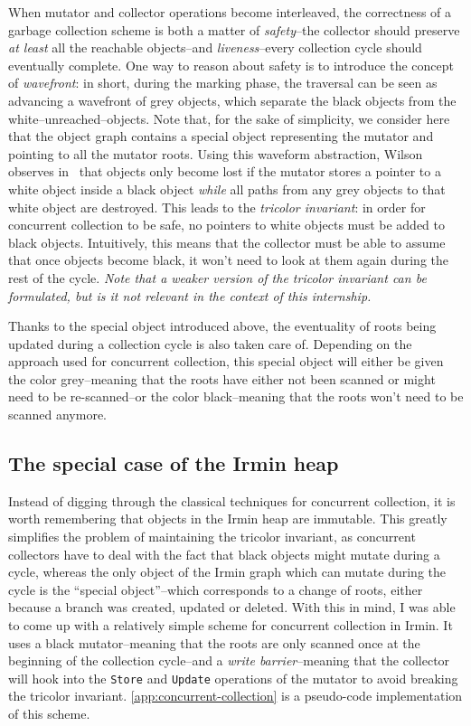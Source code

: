 When mutator and collector operations become interleaved, the correctness of a garbage collection scheme is both a matter of \emph{safety}--the collector should preserve \emph{at least} all the reachable objects--and \emph{liveness}--every collection cycle should eventually complete. One way to reason about safety is to introduce the concept of \emph{wavefront}: in short, during the marking phase, the traversal can be seen as advancing a wavefront of grey objects, which separate the black objects from the white--unreached--objects. Note that, for the sake of simplicity, we consider here that the object graph contains a special object representing the mutator and pointing to all the mutator roots. Using this waveform abstraction, Wilson observes in~\cite{wilson94} that objects only become lost if the mutator stores a pointer to a white object inside a black object \emph{while} all paths from any grey objects to that white object are destroyed. This leads to the \emph{tricolor invariant}: in order for concurrent collection to be safe, no pointers to white objects must be added to black objects. Intuitively, this means that the collector must be able to assume that once objects become black, it won't need to look at them again during the rest of the cycle. \emph{Note that a weaker version of the tricolor invariant can be formulated, but is it not relevant in the context of this internship.}

Thanks to the special object introduced above, the eventuality of roots being updated during a collection cycle is also taken care of. Depending on the approach used for concurrent collection, this special object will either be given the color grey--meaning that the roots have either not been scanned or might need to be re-scanned--or the color black--meaning that the roots won't need to be scanned anymore.

\subsection{The special case of the Irmin heap}

Instead of digging through the classical techniques for concurrent collection, it is worth remembering that objects in the Irmin heap are immutable. This greatly simplifies the problem of maintaining the tricolor invariant, as concurrent collectors have to deal with the fact that black objects might mutate during a cycle, whereas the only object of the Irmin graph which can mutate during the cycle is the ``special object''--which corresponds to a change of roots, either because a branch was created, updated or deleted. With this in mind, I was able to come up with a relatively simple scheme for concurrent collection in Irmin. It uses a black mutator--meaning that the roots are only scanned once at the beginning of the collection cycle--and a \emph{write barrier}--meaning that the collector will hook into the \texttt{Store} and \texttt{Update} operations of the mutator to avoid breaking the tricolor invariant. \cref{app:concurrent-collection} is a pseudo-code implementation of this scheme.

